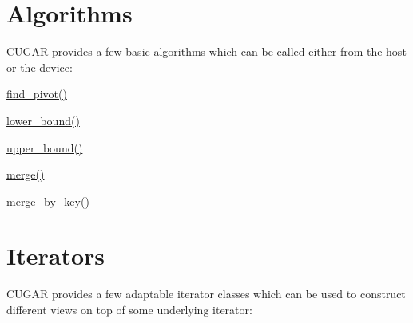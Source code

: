  \hypertarget{algorithms_page}{}\section{Algorithms}\label{algorithms_page}
C\+U\+G\+AR provides a few basic algorithms which can be called either from the host or the device\+:


\begin{DoxyItemize}
\item \hyperlink{group___algorithms_module_gaf5c0f35d93fa8af4939155b21c7e2a4f}{find\+\_\+pivot()}
\item \hyperlink{group___algorithms_module_gab5ce2c7f834a31bc40d9101865dec5d1}{lower\+\_\+bound()}
\item \hyperlink{group___algorithms_module_gafe7ee3a93350b3d2f7f7bb6266ee0425}{upper\+\_\+bound()}
\item \hyperlink{group___algorithms_module_gae6ef81c9ca1cd3976caad12299e37452}{merge()}
\item \hyperlink{group___algorithms_module_ga267a2752f3e81f521e759ec274b80561}{merge\+\_\+by\+\_\+key()} 
\end{DoxyItemize}\hypertarget{iterators_page}{}\section{Iterators}\label{iterators_page}
C\+U\+G\+AR provides a few adaptable iterator classes which can be used to construct different views on top of some underlying iterator\+:


